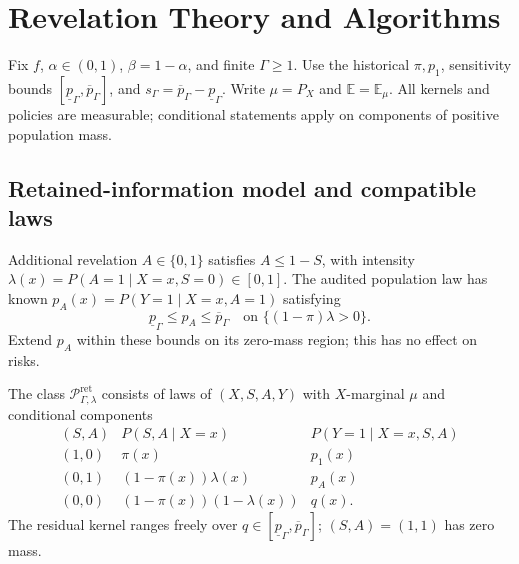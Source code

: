 \section{Revelation Theory and Algorithms}
\label{app:c}
Fix $f$, $\alpha\in(0,1)$, $\beta=1-\alpha$, and finite $\Gamma\geq1$. Use the
historical $\pi,p_1$, sensitivity bounds $[\underline p_\Gamma,\overline p_\Gamma]$,
and $s_\Gamma=\overline p_\Gamma-\underline p_\Gamma$. Write $\mu=P_X$ and
$\mathbb E=\mathbb E_\mu$. All kernels and policies are measurable; conditional
statements apply on components of positive population mass.

\subsection{Retained-information model and compatible laws}
\label{app:retained-class}\label{app:audit-information}
Additional revelation $A\in\{0,1\}$ satisfies $A\leq1-S$, with intensity
$\lambda(x)=P(A=1\mid X=x,S=0)\in[0,1]$. The audited population law has known
$p_A(x)=P(Y=1\mid X=x,A=1)$ satisfying
\begin{equation}
 \underline p_\Gamma\leq p_A\leq\overline p_\Gamma
 \quad\text{on }\{(1-\pi)\lambda>0\}.
 \label{eq:c-audit-bounds}
\end{equation}
Extend $p_A$ within these bounds on its zero-mass region; this has no effect on risks.

\begin{definition}\label{def:c-retained-class}
The class $\mathcal P^{\mathrm{ret}}_{\Gamma,\lambda}$ consists of laws of
$(X,S,A,Y)$ with $X$-marginal $\mu$ and conditional components
\[
\begin{array}{c|c|c}
(S,A)&P(S,A\mid X=x)&P(Y=1\mid X=x,S,A)\\\hline
(1,0)&\pi(x)&p_1(x)\\
(0,1)&(1-\pi(x))\lambda(x)&p_A(x)\\
(0,0)&(1-\pi(x))(1-\lambda(x))&q(x).
\end{array}
\]
The residual kernel ranges freely over
$q\in[\underline p_\Gamma,\overline p_\Gamma]$; $(S,A)=(1,1)$ has zero mass.
\end{definition}

